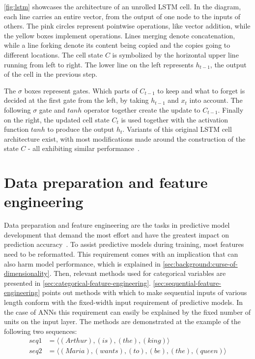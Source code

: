 \autoref{fig:lstm} showcases the architecture of an unrolled LSTM cell. In the diagram, each line carries an entire vector, from the output of one node to the inputs of others. The pink circles represent pointwise operations, like vector addition, while the yellow boxes implement operations. Lines merging denote concatenation, while a line forking denote its content being copied and the copies going to different locations. The cell state $C$ is symbolized by the horizontal upper line running from left to right. The lower line on the left represents $h_{t-1}$, the output of the cell in the previous step.

The $\sigma$ boxes represent gates. Which parts of $C_{t-1}$ to keep and what to forget is decided at the first gate from the left, by taking $h_{t-1}$ and $x_t$ into account. The following $\sigma$ gate and $tanh$ operator together create the update to $C_{t-1}$. Finally on the right, the updated cell state $C_t$ is used together with the activation function $tanh$ to produce the output $h_t$. Variants of this original LSTM cell architecture exist, with most modifications made around the construction of the state $C$ - all exhibiting similar performance~\cite{greff2017lstm}.

\section{Data preparation and feature engineering}
\label{sec:background:feature-engineering}
Data preparation and feature engineering are the tasks in predictive model development that demand the most effort and have the greatest impact on prediction accuracy~\cite{kuhn2013applied}. To assist predictive models during training, most features need to be reformatted. This requirement comes with an implication that can also harm model performance, which is explained in \autoref{sec:background:curse-of-dimensionality}.
Then, relevant methods used for categorical variables are presented in \autoref{sec:categorical-feature-engineering}. \autoref{sec:sequential-feature-engineering} points out methods with which to make sequential inputs of various length conform with the fixed-width input requirement of predictive models. In the case of ANNs this requirement can easily be explained by the fixed number of units on the input layer. The methods are demonstrated at the example of the following two sequences:
\begin{equation*}
    \begin{split}
        seq1 &= \langle(Arthur),(is),(the),(king)\rangle\\
        seq2 &= \langle(Maria),(wants),(to),(be),(the),(queen)\rangle
    \end{split}
\end{equation*}

